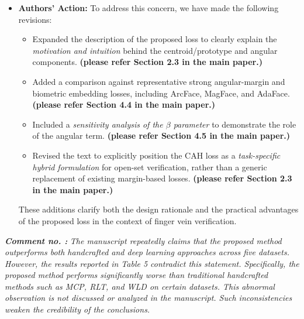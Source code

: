 \documentclass[11pt]{article}
\theoremstyle{remark}
\newcounter{mycounter} %
\newcommand\showReviewcounter{\stepcounter{mycounter}\themycounter}
\begin{document}
\begin{itemize}
	\item \textbf{Authors' Action:} 
	To address this concern, we have made the following revisions:
	\begin{itemize}
	    \item Expanded the description of the proposed loss to clearly explain the \emph{motivation and intuition} behind the centroid/prototype and angular components. \textbf{(please refer Section 2.3 in the main paper.)}
	    \item Added a comparison against representative strong angular-margin and biometric embedding losses, including ArcFace, MagFace, and AdaFace. \textbf{(please refer Section 4.4 in the main paper.)}
	    \item Included a \emph{sensitivity analysis of the $\beta$ parameter} to demonstrate the role of the angular term. \textbf{(please refer Section 4.5 in the main paper.)}
	    \item Revised the text to explicitly position the CAH loss as a \emph{task-specific hybrid formulation} for open-set verification, rather than a generic replacement of existing margin-based losses. \textbf{(please refer Section 2.3 in the main paper.)}
	\end{itemize}

	These additions clarify both the design rationale and the practical advantages of the proposed loss in the context of finger vein verification.
\end{itemize}

\color{blue} 
\textbf{\textit{Comment no. \showReviewcounter:}} 
\textit{The manuscript repeatedly claims that the proposed method outperforms both handcrafted and deep learning approaches across five datasets. However, the results reported in Table 5 contradict this statement. Specifically, the proposed method performs significantly worse than traditional handcrafted methods such as MCP, RLT, and WLD on certain datasets. This abnormal observation is not discussed or analyzed in the manuscript. Such inconsistencies weaken the credibility of the conclusions.}
\color{black}
\end{document}
